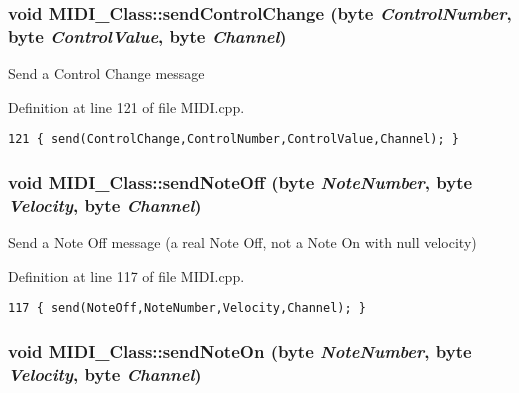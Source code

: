 \hypertarget{class_m_i_d_i___class_3a80e9bd2cfdb619be91d80e8f3b7825}{
\subsubsection[{sendControlChange}]{\setlength{\rightskip}{0pt plus 5cm}void MIDI\_\-Class::sendControlChange (byte {\em ControlNumber}, \/  byte {\em ControlValue}, \/  byte {\em Channel})}}
\label{class_m_i_d_i___class_3a80e9bd2cfdb619be91d80e8f3b7825}


Send a Control Change message 

Definition at line 121 of file MIDI.cpp.

\begin{Code}\begin{verbatim}121 { send(ControlChange,ControlNumber,ControlValue,Channel); }
\end{verbatim}
\end{Code}


\hypertarget{class_m_i_d_i___class_381e1e8019aae5f872279cda496f964c}{
\subsubsection[{sendNoteOff}]{\setlength{\rightskip}{0pt plus 5cm}void MIDI\_\-Class::sendNoteOff (byte {\em NoteNumber}, \/  byte {\em Velocity}, \/  byte {\em Channel})}}
\label{class_m_i_d_i___class_381e1e8019aae5f872279cda496f964c}


Send a Note Off message (a real Note Off, not a Note On with null velocity) 

Definition at line 117 of file MIDI.cpp.

\begin{Code}\begin{verbatim}117 { send(NoteOff,NoteNumber,Velocity,Channel); }
\end{verbatim}
\end{Code}


\hypertarget{class_m_i_d_i___class_9664e523b35d8b42749e7bc3ba888943}{
\subsubsection[{sendNoteOn}]{\setlength{\rightskip}{0pt plus 5cm}void MIDI\_\-Class::sendNoteOn (byte {\em NoteNumber}, \/  byte {\em Velocity}, \/  byte {\em Channel})}}
\label{class_m_i_d_i___class_9664e523b35d8b42749e7bc3ba888943}


